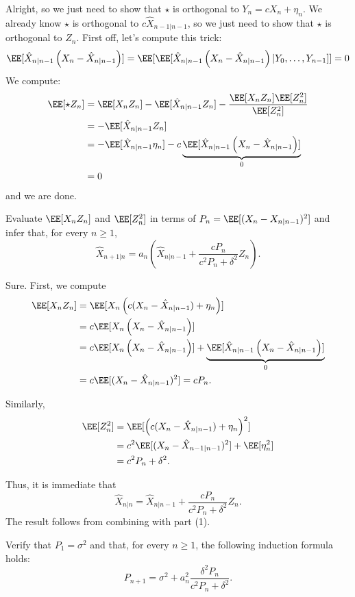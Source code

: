 \documentclass{scrartcl}
\begin{document}
Alright, so we just need to show that $\star$ is orthogonal to $Y_n = cX_n + \eta_n$. We already know $\star$ is orthogonal to $c\hat{X}_{n-1|n-1}$, so we just need to show that $\star$ is orthogonal to $Z_n$. First off, let's compute this trick:
\[
    \EE[\hat{X}_{n|n-1}\left(X_n -\hat{X}_{n|n-1}\right)] = \EE[\EE[\hat{X}_{n|n-1}\left(X_n -\hat{X}_{n|n-1}\right)|Y_0, \ldots, Y_{n-1}]] = 0
\]
We compute:
\begin{align*}
    \EE[\star Z_n] &= \EE[X_n Z_n] - \EE[\hat{X}_{n|n-1}Z_n] - \frac{\EE[X_nZ_n]\EE[Z_n^2]}{\EE[Z_n^2]}\\
    &= - \EE[\hat{X}_{n | n-1} Z_n]\\
    &= -\EE[\hat{X}_{n | n-1} \eta_n] - c\underbrace{\EE[\hat{X}_{n | n-1}\left(X_n - \hat{X}_{n|n-1}\right)]}_0\\
    &= 0
\end{align*}
and we are done.

\begin{prob}
    Evaluate $\EE[X_nZ_n]$ and $\EE[Z_n^2]$ in terms of $P_n = \EE[(X_n - X_{n|n-1})^2]$ and infer that, for every $n \geq 1$,
    \[\hat{X}_{n+1|n} = a_n\left(\hat{X}_{n|n-1} + \frac{cP_n}{c^2P_n + \delta^2}Z_n\right).\]
\end{prob}

Sure. First, we compute
\begin{align*}
    \EE[X_nZ_n] &= \EE[X_n\left(c(X_n- \hat{X}_{n|n-1}) + \eta_n \right)]\\
    &= c\EE[X_n\left(X_n -\hat{X}_{n|n-1}\right)]\\
    &= c\EE[X_n\left(X_n -\hat{X}_{n|n-1}\right)] +\underbrace{\EE[\hat{X}_{n|n-1}\left(X_n -\hat{X}_{n|n-1}\right)]}_0 \\
    &= c\EE[(X_n - \hat{X}_{n|n-1})^2] = cP_n.
\end{align*}

Similarly,
\begin{align*}
    \EE[Z_n^2] &= \EE[\left(c(X_n- \hat{X}_{n|n-1}) + \eta_n \right)^2]\\
    &= c^2\EE[(X_n - \hat{X}_{n-1|n-1})^2] + \EE[\eta_n^2]\\
    &= c^2P_n + \delta^2.
\end{align*}

Thus, it is immediate that
\[
    \hat{X}_{n|n} = \hat{X}_{n|n-1} + \frac{cP_n}{c^2P_n + \delta^2}Z_n.
\]
The result follows from combining with part (1).

\begin{prob}
    Verify that $P_1 = \sigma^2$ and that, for every $n \geq 1$, the following induction formula holds:
    \[P_{n+1} = \sigma^2 + a_n^2 \frac{\delta^2 P_n}{c^2P_n + \delta^2}.\]
\end{prob}
\end{document}
